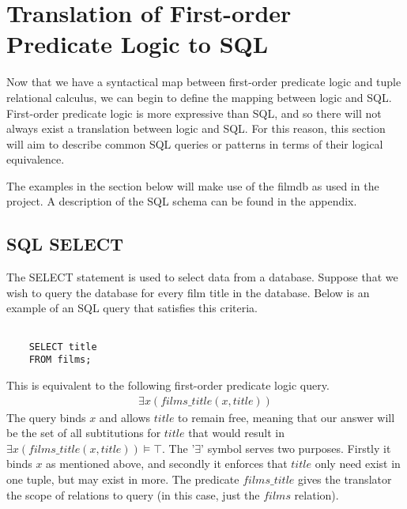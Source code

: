 \documentclass[a4paper, 11pt]{article}
\begin{document}
  \section{Translation of First-order Predicate Logic to SQL}

    Now that we have a syntactical map between first-order predicate logic and
    tuple relational calculus, we can begin to define the mapping between logic
    and SQL. First-order predicate logic
    is more expressive than SQL, and so there will not always exist a
    translation between logic and SQL. For this reason, this section will aim
    to describe common SQL queries or patterns in terms of their logical
    equivalence.

    The examples in the section below will make use of the filmdb as used in
    the project. A description of the SQL schema can be found in the appendix.

    \subsection{SQL SELECT}

    The SELECT statement is used to select data from a database.\cite{w3SELECT}
    Suppose that we wish to query the database for every film title in the
    database. Below is an example of an SQL query that satisfies this criteria.

    \begin{verbatim}

    SELECT title
    FROM films;

    \end{verbatim}

    This is equivalent to the following first-order predicate logic query.
    \begin{gather}
      \exists x(films\_title(x, title)) \label{select1}
    \end{gather}
    The query binds $x$ and allows $title$ to remain free, meaning that our
    answer will be the set of all subtitutions for $title$ that would result in
    $\exists x(films\_title(x, title)) \models \top$. The '$\exists$' symbol
    serves two purposes. Firstly it binds $x$ as mentioned above, and secondly
    it enforces that $title$ only need exist in one tuple, but may exist in
    more. The predicate $films\_title$ gives the translator the scope of
    relations to query (in this case, just the $films$ relation).
\end{document}
